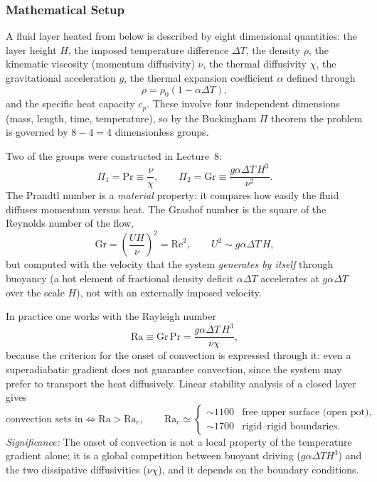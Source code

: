 \subsubsection*{Mathematical Setup}
A fluid layer heated from below is described by eight dimensional quantities:
the layer height $H$, the imposed temperature difference $\Delta T$, the
density $\rho$, the kinematic viscosity (momentum diffusivity) $\nu$, the
thermal diffusivity $\chi$, the gravitational acceleration $g$, the thermal
expansion coefficient $\alpha$ defined through
\begin{equation}
    \rho=\rho_0\left(1-\alpha\Delta T\right),
    \label{eq:lec09:expansion-law}
\end{equation}
and the specific heat capacity $c_p$. These involve four independent
dimensions (mass, length, time, temperature), so by the Buckingham
$\Pi$ theorem the problem is governed by $8-4=4$ dimensionless groups.

Two of the groups were constructed in Lecture~8:
\begin{equation}
    \Pi_1=\mathrm{Pr}\equiv\frac{\nu}{\chi},
    \qquad
    \Pi_2=\mathrm{Gr}\equiv\frac{g\alpha\Delta T\,H^3}{\nu^2}.
    \label{eq:lec09:pr-gr}
\end{equation}
The Prandtl number is a \emph{material} property: it compares how easily the
fluid diffuses momentum versus heat. The Grashof number is the square of the
Reynolds number of the flow,
\begin{equation}
    \mathrm{Gr}=\left(\frac{UH}{\nu}\right)^2=\mathrm{Re}^2,
    \qquad
    U^2\sim g\alpha\Delta T\,H,
    \label{eq:lec09:gr-re}
\end{equation}
but computed with the velocity that the system \emph{generates by itself}
through buoyancy (a hot element of fractional density deficit
$\alpha\Delta T$ accelerates at $g\alpha\Delta T$ over the scale $H$), not
with an externally imposed velocity.

In practice one works with the Rayleigh number
\begin{equation}
    \mathrm{Ra}\equiv\mathrm{Gr}\,\mathrm{Pr}
    =\frac{g\alpha\Delta T\,H^3}{\nu\chi},
    \label{eq:lec09:rayleigh}
\end{equation}
because the criterion for the onset of convection is expressed through it:
even a superadiabatic gradient does not guarantee convection, since the system
may prefer to transport the heat diffusively. Linear stability analysis of a
closed layer gives
\begin{equation}
    \boxed{
    \text{convection sets in}
    \iff
    \mathrm{Ra}>\mathrm{Ra}_c,
    \qquad
    \mathrm{Ra}_c\simeq
    \begin{cases}
        \sim 1100 & \text{free upper surface (open pot)},\\[2pt]
        \sim 1700 & \text{rigid--rigid boundaries}.
    \end{cases}
    }
    \label{eq:lec09:critical-rayleigh}
\end{equation}
\textit{Significance:} The onset of convection is not a local property of the
temperature gradient alone; it is a global competition between buoyant driving
($g\alpha\Delta T H^3$) and the two dissipative diffusivities ($\nu\chi$), and
it depends on the boundary conditions.


